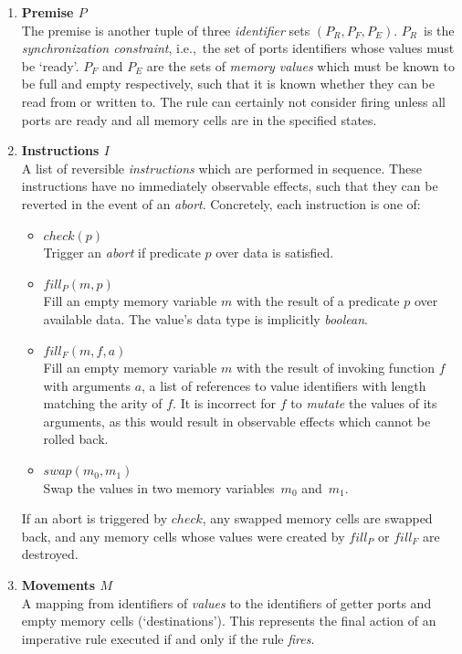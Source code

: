 \begin{enumerate}
	\item \textbf{Premise $P$}\\
	The premise is another tuple of three \textit{identifier} sets $(P_R, P_F, P_E)$. $P_R$~is the \textit{synchronization constraint}, i.e.,\ the set of ports identifiers whose values must be `ready'. $P_F$ and $P_E$ are the sets of \textit{memory values} which must be known to be full and empty respectively, such that it is known whether they can be read from or written to. The rule can certainly not consider firing unless all ports are ready and all memory cells are in the specified states.
	
	\item \textbf{Instructions $I$}\\
	A list of reversible \textit{instructions} which are performed in sequence. These instructions have no immediately observable effects, such that they can be reverted in the event of an \textit{abort}. Concretely, each instruction is one of:
	\begin{itemize}
		\item $check(p)$\\
		Trigger an \textit{abort} if predicate $p$ over data is satisfied.
		\item $fill_P(m, p)$\\Fill an empty memory variable $m$ with the result of a predicate $p$ over available data. The value's data type is implicitly \textit{boolean}.
		\item $fill_F(m, f, a)$\\
		Fill an empty memory variable $m$ with the result of invoking function $f$ with arguments $a$, a list of references to value identifiers with length matching the arity of $f$. It is incorrect for $f$ to \textit{mutate} the values of its arguments, as this would result in observable effects which cannot be rolled back.
		\item $swap(m_0,m_1)$\\
		Swap the values in two memory variables~$m_0$ and~$m_1$.
	\end{itemize}
	If an abort is triggered by $check$, any swapped memory cells are swapped back, and any memory cells whose values were created by $fill_P$ or $fill_F$ are destroyed.
	
	\item \textbf{Movements $M$}\\
	A mapping from identifiers of \textit{values} to the identifiers of getter ports and empty memory cells (`destinations'). This represents the final action of an imperative rule executed if and only if the rule \textit{fires}.
\end{enumerate}

